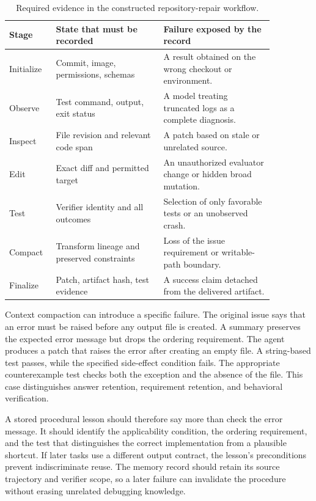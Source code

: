 \begin{table}[!htbp]
\centering
\caption{Required evidence in the constructed repository-repair workflow.}\label{tab:C33:repair}
\begin{tabular}{L{0.13\linewidth}L{0.36\linewidth}L{0.37\linewidth}}

\toprule Stage & State that must be recorded & Failure exposed by the record\\\midrule
Initialize & Commit, image, permissions, schemas & A result obtained on the wrong checkout or environment.\\
Observe & Test command, output, exit status & A model treating truncated logs as a complete diagnosis.\\
Inspect & File revision and relevant code span & A patch based on stale or unrelated source.\\
Edit & Exact diff and permitted target & An unauthorized evaluator change or hidden broad mutation.\\
Test & Verifier identity and all outcomes & Selection of only favorable tests or an unobserved crash.\\
Compact & Transform lineage and preserved constraints & Loss of the issue requirement or writable-path boundary.\\
Finalize & Patch, artifact hash, test evidence & A success claim detached from the delivered artifact.\\
\bottomrule
\end{tabular}
\end{table}

Context compaction can introduce a specific failure. The original issue says that an error must be raised before any output file is created. A summary preserves the expected error message but drops the ordering requirement. The agent produces a patch that raises the error after creating an empty file. A string-based test passes, while the specified side-effect condition fails. The appropriate counterexample test checks both the exception and the absence of the file. This case distinguishes answer retention, requirement retention, and behavioral verification.

A stored procedural lesson should therefore say more than check the error message. It should identify the applicability condition, the ordering requirement, and the test that distinguishes the correct implementation from a plausible shortcut. If later tasks use a different output contract, the lesson's preconditions prevent indiscriminate reuse. The memory record should retain its source trajectory and verifier scope, so a later failure can invalidate the procedure without erasing unrelated debugging knowledge.

